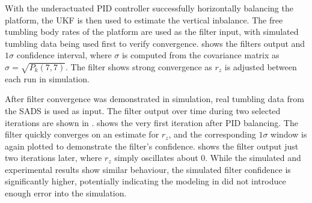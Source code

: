 With the underactuated PID controller successfully horizontally balancing the platform, the UKF is then used to estimate the vertical inbalance. The free tumbling body rates of the platform are used as the filter input, with simulated tumbling data being used first to verify convergence.  shows the filters output and $1\sigma$ confidence interval, where $\sigma$ is computed from the covariance matrix as $\sigma=\sqrt{P_k(7,7)}$. The filter shows strong convergence as $r_z$ is adjusted between each run in simulation. 

After filter convergence was demonstrated in simulation, real tumbling data from the SADS is used as input. The filter output over time during two selected iterations are shown in .  shows the very first iteration after PID balancing. The filter quickly converges on an estimate for $r_z$, and the corresponding $1\sigma$ window is again plotted to demonstrate the filter's confidence.  shows the filter output just two iterations later, where $r_z$ simply oscillates about 0. While the simulated and experimental results show similar behaviour, the simulated filter confidence is significantly higher, potentially indicating the modeling in  did not introduce enough error into the simulation. 

